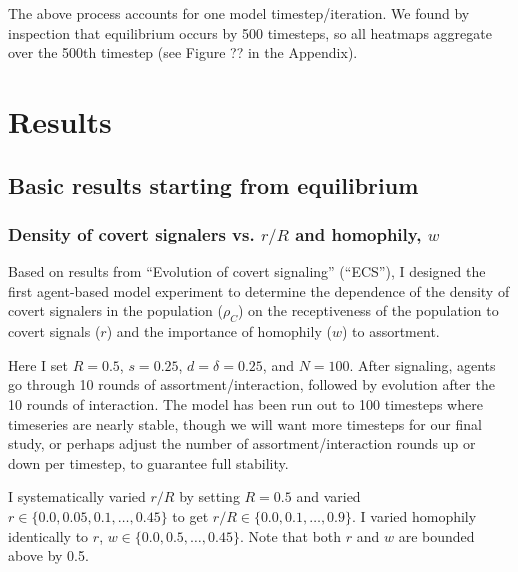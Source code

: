 \documentclass[11pt,letterpaper]{article}
\begin{document}
The above process accounts for one model timestep/iteration. We found by
inspection that equilibrium occurs by 500 timesteps, so all heatmaps aggregate
over the 500th timestep (see Figure ?? in the Appendix). 

\section{Results}

\subsection{Basic results starting from equilibrium}

\subsubsection{Density of covert signalers vs. $r/R$ and homophily, $w$}

Based on results from ``Evolution of covert signaling'' (``ECS''), I designed
the first agent-based model experiment to determine the dependence of the
density of covert signalers in the population ($\rho_C$) on
the receptiveness of the population to covert signals ($r$) and the
importance of homophily ($w$) to assortment. 

Here I set $R=0.5$, $s=0.25$, $d=\delta=0.25$,
and $N=100$. After signaling, agents go through 10 rounds of assortment/interaction,
followed by evolution after the 10 rounds of interaction. The model has been
run out to 100 timesteps where timeseries are nearly stable, though we will
want more timesteps for our final study, or perhaps adjust the number of 
assortment/interaction rounds up or down per timestep, to guarantee full 
stability.

I systematically varied $r/R$ by setting $R=0.5$ and varied 
$r \in \{0.0, 0.05, 0.1, \ldots, 0.45\}$ to get $r/R \in \{0.0, 0.1, \ldots, 0.9\}$.
I varied homophily identically to $r$, $w \in \{0.0, 0.5, \ldots, 0.45\}$. Note
that both $r$ and $w$ are bounded above by 0.5.
\end{document}
